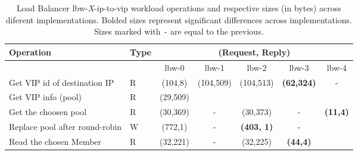 \begin{table}[H]
\small
\begin{tabular}{llccccc}
 Operation & Type &  \multicolumn{5}{c}{ (Request, Reply) } \\  \midrule
&  & lbw-0 & lbw-1  & lbw-2 & lbw-3 & lbw-4 \\ \toprule 
Get VIP id of destination IP  & R & (104,8) &\multirow{2}{*}{(104,509)} &  \multirow{2}{*}{(104,513)} &\multirow{2}{*}{\textbf{(62,324)}} & \multirow{2}{*}{-}    \\\cmidrule{1-2} 
Get VIP info (pool)   & R &  (29,509) & & & &   \\ \midrule 
Get the choosen pool  & R & (30,369)  &  - & (30,373) & -   & \multirow{3}{*}[-2mm]{\textbf{(11,4)}}  \\  \cmidrule{1-2} 
Replace pool after round-robin  & W & (772,1) & -
&\textbf{(403, 1)} &  - \\ \cmidrule{1-2}  
  Read the chosen Member &  R & (32,221) & - & (32,225) & \textbf{(44,4)} & \\\bottomrule  
\end{tabular}\caption[Load Balancer IP to VIP workload operations across
diferent implementations.]{Load Balancer  lbw-\textit{X}-ip-to-vip workload
  operations and respective sizes (in bytes) across diferent
  implementations. Bolded sizes represent significant differences
  across implementations. Sizes marked with \texttt{-} are equal to
  the previous. } 
\end{table}


\begin{figure}[ht]
\begin{floatrow}


\end{floatrow}
\end{figure}


